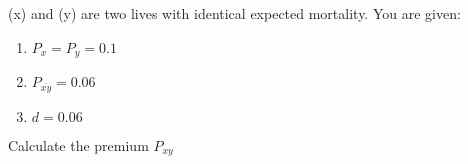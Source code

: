 (x) and (y) are two lives with identical expected mortality.
You are given:
\begin{enumerate}
\item $P_x = P_y = 0.1$
\item $P_{\overline{xy}} = 0.06 $ %
\item $d = 0.06$
\end{enumerate}
Calculate the premium $P_{xy}$ %
